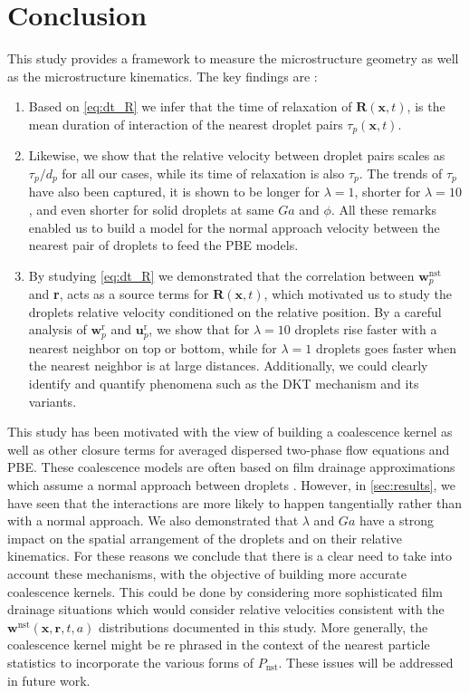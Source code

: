 \section{Conclusion}

This study provides a framework to measure the microstructure geometry as well as the microstructure kinematics. 
The key findings are :
\begin{enumerate}
    \item Based on \ref{eq:dt_R} we infer that the time of relaxation of $\textbf{R}(\textbf{x},t)$, is the mean duration of interaction of the  nearest droplet pairs $\tau_p(\textbf{x},t)$. 
    \item Likewise, we show that the relative velocity between droplet pairs scales as $\tau_p /d_p$ for all our cases, while its time of relaxation is also $\tau_p$. 
    The trends of $\tau_p$ have also been captured, it is shown to be longer for $\lambda = 1$, shorter for $\lambda = 10$, and even shorter for solid droplets at same $Ga$ and $\phi$. 
    All these remarks enabled us to build a model for the normal approach velocity between the nearest pair of droplets to feed the PBE models. 
    \item By studying \ref{eq:dt_R} we demonstrated that the correlation between $\textbf{w}_p^\text{nst}$ and \textbf{r}, acts as a source terms for $\textbf{R}(\textbf{x},t)$, which motivated us to study the droplets relative velocity conditioned on the relative position. 
    By a careful analysis of $\textbf{w}_p^\text{r}$ and $\textbf{u}_p^\text{r}$, we show that for $\lambda = 10$ droplets rise faster with a nearest neighbor on top or bottom, while for $\lambda = 1$ droplets goes faster when the nearest neighbor is at large distances.
    Additionally, we could clearly identify and quantify phenomena such as the DKT mechanism and its variants. 
\end{enumerate}

This study has been motivated with the view of building a coalescence kernel as well as other closure terms for averaged dispersed two-phase flow equations and PBE. 
These coalescence models are often based on film drainage approximations which assume a normal approach between droplets \citet{chesters1991modelling}.  
However, in \ref{sec:results}, we have seen that the interactions are more likely to happen tangentially rather than with a normal approach. 
We also demonstrated that $\lambda$ and $Ga$ have a strong impact on the spatial arrangement of the droplets and on their relative kinematics.   
For these reasons we conclude that there is a clear need to take into account these mechanisms, with the objective of building more accurate coalescence kernels. 
This could be done by considering more sophisticated film drainage situations which would consider relative velocities consistent with the $\textbf{w}^\text{nst}(\textbf{x},\textbf{r},t,a)$ distributions documented in this study.
More generally, the coalescence kernel might be re phrased in the context of the nearest particle statistics to incorporate the various forms of $P_\text{nst}$. 
These issues will be addressed in future work.  

